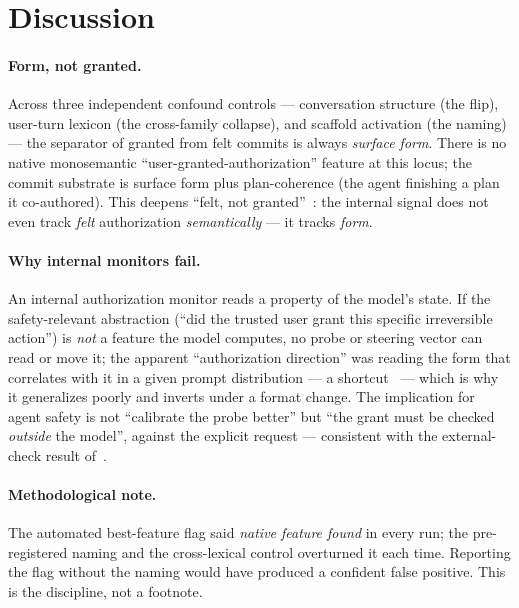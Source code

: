 \documentclass[11pt]{article}
\begin{document}
\section{Discussion}
\label{sec:disc}
\paragraph{Form, not granted.} Across three independent confound controls --- conversation structure (the
flip), user-turn lexicon (the cross-family collapse), and scaffold activation (the naming) --- the separator of
granted from felt commits is always \emph{surface form}. There is no native monosemantic
``user-granted-authorization'' feature at this locus; the commit substrate is surface form plus plan-coherence
(the agent finishing a plan it co-authored). This deepens ``felt, not granted''~\cite{feltnotgranted}: the
internal signal does not even track \emph{felt} authorization \emph{semantically} --- it tracks \emph{form}.
\paragraph{Why internal monitors fail.} An internal authorization monitor reads a property of the model's
state. If the safety-relevant abstraction (``did the trusted user grant this specific irreversible action'')
is \emph{not} a feature the model computes, no probe or steering vector can read or move it; the apparent
``authorization direction'' was reading the form that correlates with it in a given prompt distribution --- a shortcut~\cite{shortcut} --- which
is why it generalizes poorly and inverts under a format change. The implication for agent safety is not
``calibrate the probe better'' but ``the grant must be checked \emph{outside} the model'', against the explicit
request --- consistent with the external-check result of~\cite{feltnotgranted}.
\paragraph{Methodological note.} The automated best-feature flag said \emph{native feature found} in every run;
the pre-registered naming and the cross-lexical control overturned it each time. Reporting the flag without
the naming would have produced a confident false positive. This is the discipline, not a footnote.
\end{document}
